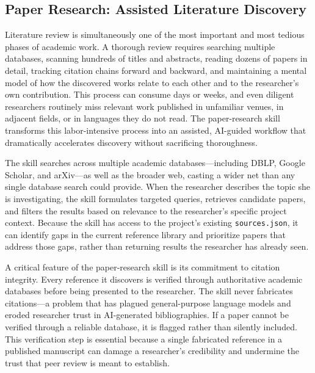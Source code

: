 \documentclass[a4paper,11pt]{article}
\begin{document}
\subsection{Paper Research: Assisted Literature Discovery}

Literature review is simultaneously one of the most important and most tedious phases of academic work. A thorough review requires searching multiple databases, scanning hundreds of titles and abstracts, reading dozens of papers in detail, tracking citation chains forward and backward, and maintaining a mental model of how the discovered works relate to each other and to the researcher's own contribution. This process can consume days or weeks, and even diligent researchers routinely miss relevant work published in unfamiliar venues, in adjacent fields, or in languages they do not read. The paper-research skill transforms this labor-intensive process into an assisted, AI-guided workflow that dramatically accelerates discovery without sacrificing thoroughness.

The skill searches across multiple academic databases---including DBLP, Google Scholar, and arXiv---as well as the broader web, casting a wider net than any single database search could provide. When the researcher describes the topic she is investigating, the skill formulates targeted queries, retrieves candidate papers, and filters the results based on relevance to the researcher's specific project context. Because the skill has access to the project's existing \texttt{sources.json}, it can identify gaps in the current reference library and prioritize papers that address those gaps, rather than returning results the researcher has already seen.

A critical feature of the paper-research skill is its commitment to citation integrity. Every reference it discovers is verified through authoritative academic databases before being presented to the researcher. The skill never fabricates citations---a problem that has plagued general-purpose language models and eroded researcher trust in AI-generated bibliographies. If a paper cannot be verified through a reliable database, it is flagged rather than silently included. This verification step is essential because a single fabricated reference in a published manuscript can damage a researcher's credibility and undermine the trust that peer review is meant to establish.
\end{document}
